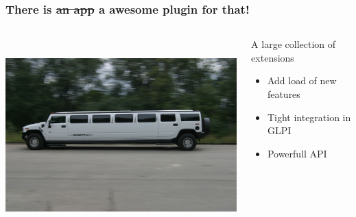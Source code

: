 \documentclass{beamer}
\begin{document}
\begin{frame}

    \frametitle{\textbf{There is \sout{an app} a awesome plugin for that!}}

 \begin{columns}
 \begin{column}{0.45\textwidth}
         \includegraphics[height=7.5cm]{./pics/plugin.jpg}
 \end{column}
 \begin{column}{0.65\textwidth}
    \begin{block}{A large collection of \\
    extensions}
        \begin{itemize}
            \item Add load of new features
            \item Tight integration in GLPI
            \item Powerfull API
        \end{itemize}
    \end{block}

 \end{column}
\end{columns}

\end{frame}
\end{document}

